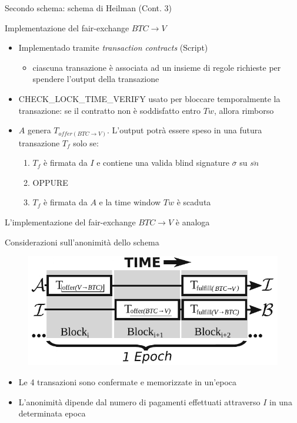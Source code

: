 \documentclass{beamer}
\begin{document}
  
  
  \begin{frame}{Secondo schema: schema di Heilman (Cont. 3)}
      \begin{block}{Implementazione del fair-exchange $BTC\rightarrow V$}
        \begin{itemize}
            \item Implementado tramite \emph{transaction contracts} (Script)
            \begin{itemize}
                \item[\MVRightarrow] ciascuna transazione è associata ad un insieme di regole richieste per spendere l'output della transazione
            \end{itemize}
            \item CHECK\_LOCK\_TIME\_VERIFY usato per bloccare temporalmente la transazione: se il contratto non è soddisfatto entro $Tw$, allora rimborso 
            \item $A$ genera $T_{offer(BTC\rightarrow V)}$. L'output potrà essere speso in una futura transazione $T_f$ solo se:
            \begin{enumerate}
                \item $T_f$ è firmata da $I$ e contiene una valida blind signature $\overline\sigma$ su $\overline{sn}$
                \item[] OPPURE 
                \item $T_f$ è firmata da $A$ e la time window $Tw$ è scaduta
            \end{enumerate}
        \end{itemize}
      \end{block}
      \pause
      
      L'implementazione del fair-exchange $BTC\rightarrow V$ è analoga
  \end{frame}
  
  
  
  
  
  \begin{frame}{Considerazioni sull'anonimità dello schema}
      \begin{figure}
          \centering
          \includegraphics[width=0.4\linewidth]{../img/epochs.png}
      \end{figure}
      \begin{itemize}
          \item Le 4 transazioni sono confermate e memorizzate in un'epoca
          \item L'anonimità dipende dal numero di pagamenti effettuati attraverso $I$ in una determinata epoca
      \end{itemize}
  \end{frame}
  
\end{document}
